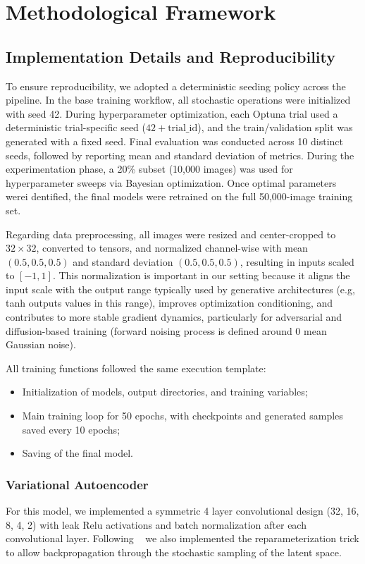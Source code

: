 \documentclass[runningheads]{llncs}
\begin{document}
\section{Methodological Framework}

\subsection{Implementation Details and Reproducibility}

To ensure reproducibility, we adopted a deterministic seeding policy across the pipeline. 
In the base training workflow, all stochastic operations were initialized with seed 42. 
During hyperparameter optimization, each Optuna trial used a deterministic trial-specific 
seed ($42 + \text{trial\_id}$), and the train/validation split was generated with a fixed seed. 
Final evaluation was conducted across 10 distinct seeds, followed by reporting mean and standard deviation
of metrics. During the experimentation phase, a 20\%  subset (10,000 images) was used for hyperparameter sweeps via Bayesian optimization. 
Once optimal parameters werei  dentified, the final models were retrained on the 
full 50,000-image training set.

Regarding data preprocessing, all images were resized and center-cropped to $32\times32$, 
converted to tensors, and normalized channel-wise with mean $(0.5, 0.5, 0.5)$ and 
standard deviation $(0.5, 0.5, 0.5)$, resulting in inputs scaled to $[-1,1]$. 
This normalization is important in our setting because it aligns the input scale with the 
output range typically used by generative architectures (e.g, tanh outputs values in this range), improves optimization conditioning, 
and contributes to more stable gradient dynamics, particularly for adversarial and 
diffusion-based training (forward noising process is defined around 0 mean Gaussian noise).

All training functions followed the same execution template:
\begin{itemize}
    \item Initialization of models, output directories, and training variables;
    \item Main training loop for 50 epochs, with checkpoints and generated samples saved every 10 epochs;
    \item Saving of the final model.
\end{itemize}

\subsubsection{Variational Autoencoder}
For this model, we implemented a symmetric 4 layer convolutional design 
(32, 16, 8, 4, 2) with leak Relu activations and batch normalization 
after each convolutional layer. Following ~\cite{vae} we also
implemented the reparameterization trick to allow backpropagation through the stochastic sampling of the latent space.
\end{document}
